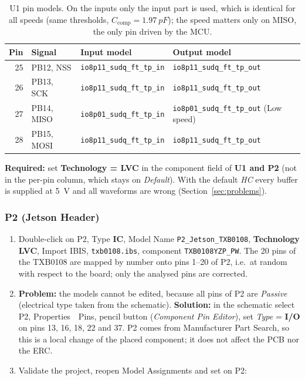 \documentclass[11pt,a4paper]{article}
\newcommand{\required}[1]{\begin{reqbox}\textbf{\color{reqred}Required:} #1\end{reqbox}}
\newcommand{\gui}[1]{\textsf{#1}}
\newcommand{\m}{\,\guillemotright\ }
\begin{document}
\begin{table}[H]
\centering
\begin{tabular}{rlll}
\toprule
Pin & Signal & Input model & Output model \\
\midrule
25 & PB12, NSS  & \texttt{io8p11\_sudq\_ft\_tp\_in} & \texttt{io8p11\_sudq\_ft\_tp\_out} \\
26 & PB13, SCK  & \texttt{io8p11\_sudq\_ft\_tp\_in} & \texttt{io8p11\_sudq\_ft\_tp\_out} \\
27 & PB14, MISO & \texttt{io8p01\_sudq\_ft\_tp\_in} & \texttt{io8p01\_sudq\_ft\_tp\_out} (Low speed) \\
28 & PB15, MOSI & \texttt{io8p11\_sudq\_ft\_tp\_in} & \texttt{io8p11\_sudq\_ft\_tp\_out} \\
\bottomrule
\end{tabular}
\caption{U1 pin models. On the inputs only the input part is used, which is identical for all
speeds (same thresholds, $C_\text{comp} = \qty{1.97}{pF}$); the speed matters only on MISO, the only pin driven
by the MCU.}
\label{tab:u1models}
\end{table}

\required{set \textbf{Technology = LVC} in the component field of \textbf{U1 and P2} (not in the
per-pin column, which stays on \textit{Default}). With the default \textit{HC} every buffer is supplied at
\qty{5}{V} and all waveforms are wrong (Section~\ref{sec:problems}).}

\subsubsection{P2 (Jetson Header)}

\begin{enumerate}
    \item Double-click on P2, Type \textbf{IC}, Model Name \texttt{P2\_Jetson\_TXB0108}, \textbf{Technology LVC}, \gui{Import
    IBIS}, \texttt{txb0108.ibs}, component \texttt{TXB0108YZP\_PW}. The 20 pins of the TXB0108 are mapped
    by number onto pins 1--20 of P2, i.e.\ at random with respect to the board; only the analysed
    pins are corrected.
    \item \textbf{Problem:} the models cannot be edited, because all pins of P2 are \textit{Passive} (electrical type
    taken from the schematic). \textbf{Solution:} in the schematic select P2, \gui{Properties \m Pins}, pencil
    button (\textit{Component Pin Editor}), set \textit{Type} = \textbf{I/O} on pins 13, 16, 18, 22 and 37. P2 comes
    from Manufacturer Part Search, so this is a local change of the placed component; it does
    not affect the PCB nor the ERC.
    \item Validate the project, reopen Model Assignments and set on P2:
\end{enumerate}
\end{document}
